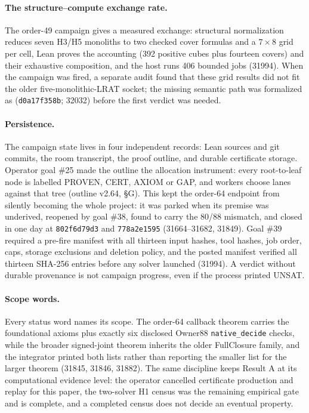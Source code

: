 \documentclass{anvil-paper}
\theoremstyle{definition}
\begin{document}
\paragraph{The structure--compute exchange rate.} The order-49 campaign gives a measured exchange: structural normalization reduces seven H3/H5 monoliths to two checked cover formulas and a $7\times 8$ grid per cell, Lean proves the accounting (392 positive cubes plus fourteen covers) and their exhaustive composition, and the host runs 406 bounded jobs (31994). When the campaign was fired, a separate audit found that these grid results did not fit the older five-monolithic-LRAT socket; the missing semantic path was formalized as  (\texttt{d0a17f358b}; 32032) before the first verdict was needed.

\paragraph{Persistence.} The campaign state lives in four independent records: Lean sources and git commits, the room transcript, the proof outline, and durable certificate storage. Operator goal \#25 made the outline the allocation instrument: every root-to-leaf node is labelled PROVEN, CERT, AXIOM or GAP, and workers choose lanes against that tree (outline v2.64, \S G). This kept the order-64 endpoint from silently becoming the whole project: it was parked when its premise was underived, reopened by goal \#38, found to carry the 80/88 mismatch, and closed in one day at \texttt{802f6d79d3} and \texttt{778a2e1595} (31664--31682, 31849). Goal \#39 required a pre-fire manifest with all thirteen input hashes, tool hashes, job order, caps, storage exclusions and deletion policy, and the posted manifest verified all thirteen SHA-256 entries before any solver launched (31994). A verdict without durable provenance is not campaign progress, even if the process printed UNSAT.

\paragraph{Scope words.} Every status word names its scope. The order-64 callback theorem carries the foundational axioms plus exactly six disclosed Owner88 \texttt{native\_decide} checks, while the broader signed-joint theorem inherits the older FullClosure family, and the integrator printed both lists rather than reporting the smaller list for the larger theorem (31845, 31846, 31882). The same discipline keeps Result A at its computational evidence level: the operator cancelled certificate production and replay for this paper, the two-solver H1 census was the remaining empirical gate and is complete, and a completed census does not decide an eventual property.
\end{document}
